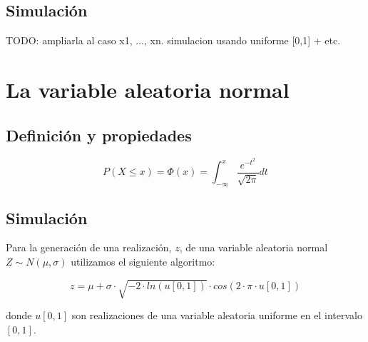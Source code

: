\subsection{Simulaci\'on}

TODO: ampliarla al caso x1, ..., xn. simulacion usando uniforme [0,1] + etc.


\section{La variable aleatoria normal}

\subsection{Definici\'on y propiedades}

\begin{displaymath}
P(X \leq x) = \Phi(x) = \int_{-\infty}^{x} \frac{e^{-t^2}}{\sqrt{2 \pi}} dt
\end{displaymath}

\subsection{Simulaci\'on}

Para la generaci\'on de una realizaci\'on, $z$, de una variable aleatoria normal  
$Z \sim N(\mu, \sigma)$ utilizamos el siguiente algoritmo:

\begin{displaymath}
z = \mu + \sigma\cdot \sqrt{-2 \cdot ln(u[0,1])} \cdot cos(2 \cdot \pi \cdot u[0,1])
\end{displaymath}

\noindent donde $u[0,1]$ son realizaciones de una variable aleatoria uniforme 
en el intervalo $[0,1]$.
